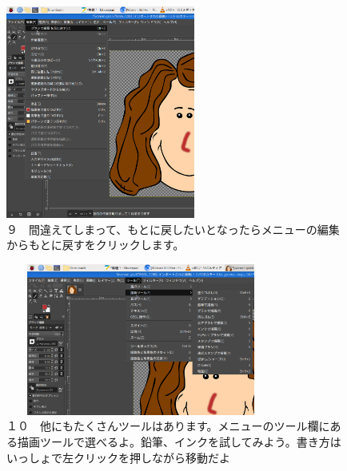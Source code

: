 \documentclass[a4paper,12pt]{jarticle}
\begin{document}
\begin{figure}[ht]
  \begin{minipage}{\textwidth}
    \begin{minipage}{6.984cm}
      \includegraphics[width=6.228cm]{textbook-img132.png}\\
      ９　間違えてしまって、もとに戻したいとなったらメニューの編集からもとに戻すをクリックします。
    \end{minipage}
    \hfill
    \begin{minipage}{8.966cm}
      \includegraphics[width=8.881cm,height=4.997cm]{textbook-img133.png}\\
      １０　他にもたくさんツールはあります。メニューのツール欄にある描画ツールで選べるよ。鉛筆、インクを試してみよう。書き方はいっしょで左クリックを押しながら移動だよ
    \end{minipage}
  \end{minipage}
\end{figure}

~
\end{document}
